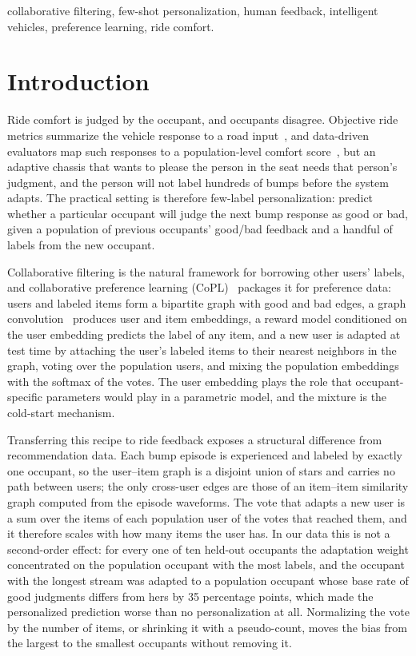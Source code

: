\documentclass[conference]{IEEEtran}
\begin{document}
\begin{IEEEkeywords}
collaborative filtering, few-shot personalization, human feedback, intelligent vehicles, preference learning, ride comfort.
\end{IEEEkeywords}

\section{Introduction}
\label{sec:intro}

Ride comfort is judged by the occupant, and occupants disagree. Objective ride metrics summarize the vehicle response to a road input~\cite{guastadisegni2024ride,iso2631}, and data-driven evaluators map such responses to a population-level comfort score~\cite{cieslak2020ride,kim2019evaluator}, but an adaptive chassis that wants to please the person in the seat needs that person's judgment, and the person will not label hundreds of bumps before the system adapts. The practical setting is therefore few-label personalization: predict whether a particular occupant will judge the next bump response as good or bad, given a population of previous occupants' good/bad feedback and a handful of labels from the new occupant.

Collaborative filtering is the natural framework for borrowing other users' labels, and collaborative preference learning (CoPL)~\cite{choi2025copl} packages it for preference data: users and labeled items form a bipartite graph with good and bad edges, a graph convolution~\cite{he2020lightgcn} produces user and item embeddings, a reward model conditioned on the user embedding predicts the label of any item, and a new user is adapted at test time by attaching the user's labeled items to their nearest neighbors in the graph, voting over the population users, and mixing the population embeddings with the softmax of the votes. The user embedding plays the role that occupant-specific parameters would play in a parametric model, and the mixture is the cold-start mechanism.

Transferring this recipe to ride feedback exposes a structural difference from recommendation data. Each bump episode is experienced and labeled by exactly one occupant, so the user--item graph is a disjoint union of stars and carries no path between users; the only cross-user edges are those of an item--item similarity graph computed from the episode waveforms. The vote that adapts a new user is a sum over the items of each population user of the votes that reached them, and it therefore scales with how many items the user has. In our data this is not a second-order effect: for every one of ten held-out occupants the adaptation weight concentrated on the population occupant with the most labels, and the occupant with the longest stream was adapted to a population occupant whose base rate of good judgments differs from hers by 35 percentage points, which made the personalized prediction worse than no personalization at all. Normalizing the vote by the number of items, or shrinking it with a pseudo-count, moves the bias from the largest to the smallest occupants without removing it.
\end{document}
